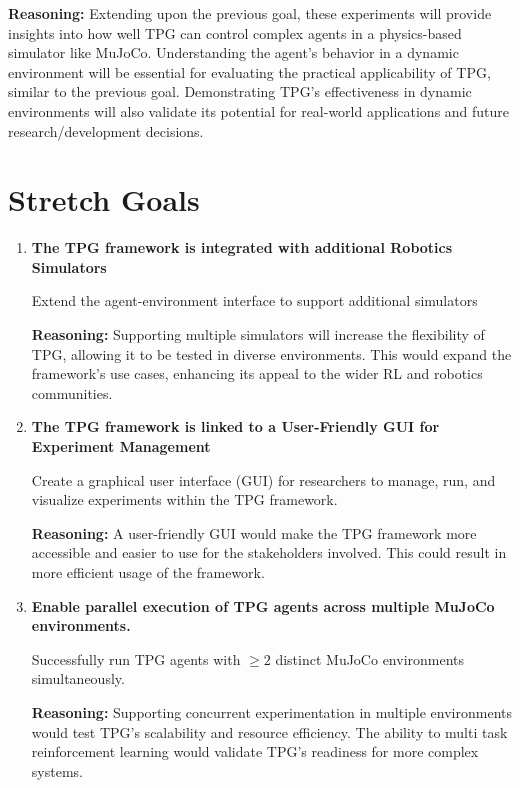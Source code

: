 \documentclass{article}
\begin{document}
\begin{enumerate} [leftmargin=*]
\textbf{Reasoning:} Extending upon the previous goal, these experiments will provide insights into how well TPG can control complex agents in a physics-based simulator like MuJoCo. Understanding the agent’s behavior in a dynamic environment will be essential for evaluating the practical applicability of TPG, similar to the previous goal.  Demonstrating TPG’s effectiveness in dynamic environments will also validate its potential for real-world applications and future research/development decisions.


\end{enumerate}




\section{Stretch Goals}





\begin{enumerate} [leftmargin=*]
        \item \textbf{The TPG framework is integrated with additional Robotics Simulators}

Extend the agent-environment interface to support additional simulators

\textbf{Reasoning:} Supporting multiple simulators will increase the flexibility of TPG, allowing it to be tested in diverse environments. This would expand the framework’s use cases, enhancing its appeal to the wider RL and robotics communities.




\item \textbf{The TPG framework is linked to a User-Friendly GUI for Experiment Management}
          
Create a graphical user interface (GUI) for researchers to manage, run, and visualize experiments within the TPG framework.

\textbf{Reasoning:} A user-friendly GUI would make the TPG framework more accessible and easier to use for the stakeholders involved. This could result in more efficient usage of the framework.

\item \textbf{Enable parallel execution of TPG agents across multiple MuJoCo environments.}

Successfully run TPG agents with $\geq 2$ distinct MuJoCo environments simultaneously.

\textbf{Reasoning:} Supporting concurrent experimentation in multiple environments would test TPG's scalability and resource efficiency. The ability to multi task reinforcement learning would validate TPG's readiness for more complex systems.

\end{enumerate}
\end{document}
